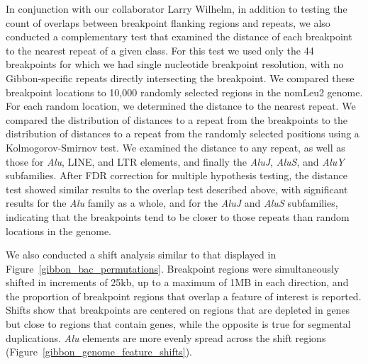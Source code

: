 In conjunction with our collaborator Larry Wilhelm, in addition to testing the count of overlaps between breakpoint flanking regions and repeats, we also conducted a complementary test that examined the distance of each breakpoint to the nearest repeat of a given class. For this test we used only the 44 breakpoints for which we had single nucleotide breakpoint resolution, with no Gibbon-specific repeats directly intersecting the breakpoint. We compared these breakpoint locations to 10,000 randomly selected regions in the nomLeu2 genome. For each random location, we determined the distance to the nearest repeat. We compared the distribution of distances to a repeat from the breakpoints to the distribution of distances to a repeat from the randomly selected positions using a Kolmogorov-Smirnov test. We examined the distance to any repeat, as well as those for \emph{Alu}, LINE, and LTR elements, and finally the \emph{AluJ}, \emph{AluS}, and \emph{AluY} subfamilies. After FDR correction for multiple hypothesis testing, the distance test showed similar results to the overlap test described above, with significant results for the \emph{Alu} family as a whole, and for the \emph{AluJ} and \emph{AluS} subfamilies, indicating that the breakpoints tend to be closer to those repeats than random locations in the genome.

We also conducted a shift analysis similar to that displayed in Figure~\ref{gibbon_bac_permutations}. Breakpoint regions were simultaneously shifted in increments of 25kb, up to a maximum of 1MB in each direction, and the proportion of breakpoint regions that overlap a feature of interest is reported. Shifts show that breakpoints are centered on regions that are depleted in genes but close to regions that contain genes, while the opposite is true for segmental duplications. \emph{Alu} elements are more evenly spread across the shift regions (Figure~\ref{gibbon_genome_feature_shifts}).

